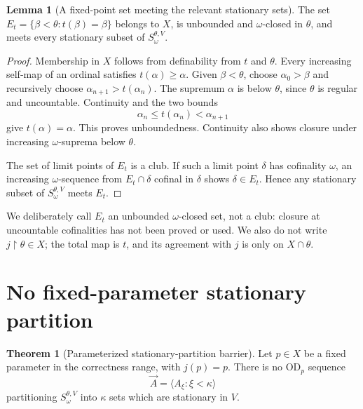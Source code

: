 \documentclass[11pt,letterpaper]{article}
\theoremstyle{definition}
\newtheorem{theorem}[definition]{Theorem}
\newtheorem{lemma}[definition]{Lemma}
\numberwithin{equation}{section}
\newcommand{\OD}{\mathrm{OD}}
\newcommand{\restr}{\mathbin{\upharpoonright}}
\begin{document}
\begin{lemma}[A fixed-point set meeting the relevant stationary sets]\label{lem:fixset}
The set $E_t=\{\beta<\theta:t(\beta)=\beta\}$ belongs to $X$, is unbounded and $\omega$-closed in $\theta$, and meets every stationary subset of $S_\omega^{\theta,V}$.
\end{lemma}

\begin{proof}
Membership in $X$ follows from definability from $t$ and $\theta$. Every increasing self-map of an ordinal satisfies $t(\alpha)\geq\alpha$. Given $\beta<\theta$, choose $\alpha_0>\beta$ and recursively choose $\alpha_{n+1}>t(\alpha_n)$. The supremum $\alpha$ is below $\theta$, since $\theta$ is regular and uncountable. Continuity and the two bounds
\[
\alpha_n\leq t(\alpha_n)<\alpha_{n+1}
\]
give $t(\alpha)=\alpha$. This proves unboundedness. Continuity also shows closure under increasing $\omega$-suprema below $\theta$.

The set of limit points of $E_t$ is a club. If such a limit point $\delta$ has cofinality $\omega$, an increasing $\omega$-sequence from $E_t\cap\delta$ cofinal in $\delta$ shows $\delta\in E_t$. Hence any stationary subset of $S_\omega^{\theta,V}$ meets $E_t$.
\end{proof}

We deliberately call $E_t$ an unbounded $\omega$-closed set, not a club: closure at uncountable cofinalities has not been proved or used. We also do not write $j\restr\theta\in X$; the total map is $t$, and its agreement with $j$ is only on $X\cap\theta$.

\section{No fixed-parameter stationary partition}\label{sec:partition}

\begin{theorem}[Parameterized stationary-partition barrier]\label{thm:partition}
Let $p\in X$ be a fixed parameter in the correctness range, with $j(p)=p$. There is no $\OD_p$ sequence
\[
\vec A=\langle A_\xi:\xi<\kappa\rangle
\]
partitioning $S_\omega^{\theta,V}$ into $\kappa$ sets which are stationary in $V$.
\end{theorem}
\end{document}
